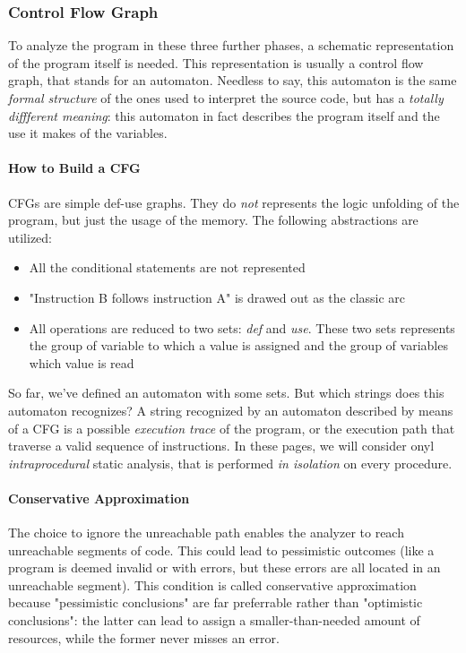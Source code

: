 \documentclass[10pt,a4paper]{article}
\begin{document}
			\subsubsection{Control Flow Graph}
				To analyze the program in these three further phases, a schematic representation of the program itself is needed. This representation is usually a control flow graph, that stands for an automaton. Needless to say, this automaton is the same \emph{formal structure} of the ones used to interpret the source code, but has a \emph{totally diffferent meaning}: this automaton in fact describes the program itself and the use it makes of the variables.
				
				\paragraph{How to Build a CFG}
					CFGs are simple def-use graphs. They do \emph{not} represents the logic unfolding of the program, but just the usage of the memory. The following abstractions are utilized:
					\begin{itemize}
						\item All the conditional statements are not represented
						\item "Instruction B follows instruction A" is drawed out as the classic arc
						\item All operations are reduced to two sets: \emph{def} and \emph{use}. These two sets represents the group of variable to which a value is assigned and the group of variables which value is read
					\end{itemize}
					So far, we've defined an automaton with some sets. But which strings does this automaton recognizes? A string recognized by an automaton described by means of a CFG is a possible \emph{execution trace} of the program, or the execution path that traverse a valid sequence of instructions. In these pages, we will consider onyl \emph{intraprocedural} static analysis, that is performed \emph{in isolation} on every procedure.
				
				\paragraph{Conservative Approximation}
					The choice to ignore the unreachable path enables the analyzer to reach unreachable segments of code. This could lead to pessimistic outcomes (like a program is deemed invalid or with errors, but these errors are all located in an unreachable segment). This condition is called conservative approximation because "pessimistic conclusions" are far preferrable rather than "optimistic conclusions": the latter can lead to assign a smaller-than-needed amount of resources, while the former never misses an error.
			
\end{document}
